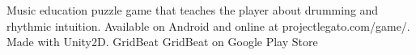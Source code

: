 \documentclass[]{awesome-cv}
\begin{document}



\vspace{-6mm}
\vspace{-2mm}

	\cventry
	{Music education puzzle game that teaches the player about drumming and rhythmic intuition. Available on Android and online at projectlegato.com/game/.
	 Made with Unity2D.}
	{GridBeat}
	{GridBeat on Google Play Store}
	{}
	{}

\end{document}
